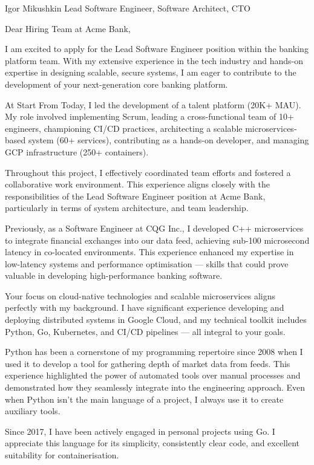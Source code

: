 \documentclass[9pt,a4paper]{juicv}
\begin{document}
\begin{paracol}{2}
\cvHeader
    {Igor Mikushkin}
    {}
    {Lead Software Engineer, Software Architect, CTO}

\setlength{\parskip}{0.7em}

Dear Hiring Team at Acme Bank,

I am excited to apply for the Lead Software Engineer position
within the banking platform team.
With my extensive experience in the tech industry
and hands-on expertise in designing scalable, secure systems,
I am eager to contribute to the development
of your next-generation core banking platform.

At Start From Today, I led the development of a talent platform (20K+ MAU).
My role involved implementing Scrum,
leading a cross-functional team of 10+ engineers,
championing CI/CD practices,
architecting a scalable microservices-based system (60+ services),
contributing as a hands-on developer,
and managing GCP infrastructure (250+ containers).

Throughout this project, I effectively coordinated team efforts
and fostered a collaborative work environment.
This experience aligns closely with the responsibilities
of the Lead Software Engineer position at Acme Bank,
particularly in terms of system architecture, and team leadership.

Previously, as a Software Engineer at CQG Inc.,
I developed C++ microservices to integrate financial exchanges into our data feed,
achieving sub-100 microsecond latency in co-located environments.
This experience enhanced my expertise
in low-latency systems and performance optimisation
--- skills that could prove valuable in developing high-performance banking software.

Your focus on cloud-native technologies
and scalable microservices aligns perfectly with my background.
I have significant experience developing
and deploying distributed systems in Google Cloud,
and my technical toolkit includes Python, Go, Kubernetes, and CI/CD pipelines
--- all integral to your goals.

Python has been a cornerstone of my programming repertoire since 2008
when I used it to develop a tool for gathering depth of market data from feeds.
This experience highlighted the power of automated tools over manual processes
and demonstrated how they seamlessly integrate into the engineering approach.
Even when Python isn't the main language of a project,
I always use it to create auxiliary tools.

Since 2017, I have been actively engaged in personal projects using Go.
I appreciate this language for its simplicity, consistently clear code,
and excellent suitability for containerisation.


\end{paracol}
\end{document}
